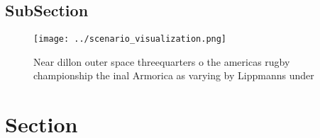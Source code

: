\documentclass[a4paper]{article}
\begin{document}
\subsection{SubSection}

\begin{figure}
\centering
\texttt{[image: ../scenario\_visualization.png]}
\caption{Near dillon outer space threequarters o the americas rugby championship the inal Armorica as varying by Lippmanns under
}
\end{figure}
 
\section{Section}
\end{document}
